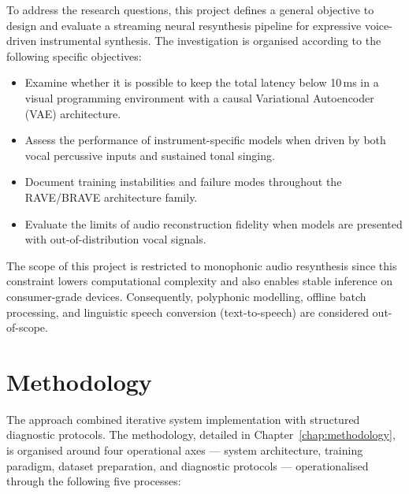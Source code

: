 \documentclass[a4paper,11pt,oneside,openany]{book}
\begin{document}
To address the research questions, this project defines a general objective to design and evaluate a streaming neural resynthesis pipeline for expressive voice-driven instrumental synthesis. The investigation is organised according to the following specific objectives:

\begin{itemize}
\item Examine whether it is possible to keep the total latency below 10\,ms in a visual programming environment with a causal Variational Autoencoder (VAE) architecture.
\item Assess the performance of instrument-specific models when driven by both vocal percussive inputs and sustained tonal singing.
\item Document training instabilities and failure modes throughout the RAVE/BRAVE architecture family.
\item Evaluate the limits of audio reconstruction fidelity when models are presented with out-of-distribution vocal signals.
\end{itemize}

The scope of this project is restricted to monophonic audio resynthesis since this constraint lowers computational complexity and also enables stable inference on consumer-grade devices. Consequently, polyphonic modelling, offline batch processing, and linguistic speech conversion (text-to-speech) are considered out-of-scope.

\section{Methodology}\label{sec:intro_methodology}

The approach combined iterative system implementation with structured diagnostic protocols. The methodology, detailed in Chapter~\ref{chap:methodology}, is organised around four operational axes --- system architecture, training paradigm, dataset preparation, and diagnostic protocols --- operationalised through the following five processes:
\end{document}
